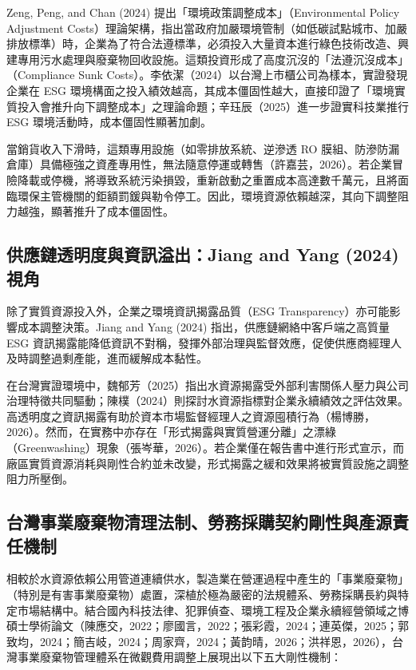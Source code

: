 \documentclass[12pt,a4paper]{article}
\begin{document}
Zeng, Peng, and Chan (2024) 提出「環境政策調整成本」（Environmental Policy Adjustment Costs）理論架構，指出當政府加嚴環境管制（如低碳試點城市、加嚴排放標準）時，企業為了符合法遵標準，必須投入大量資本進行綠色技術改造、興建專用污水處理與廢棄物回收設施。這類投資形成了高度沉沒的「法遵沉沒成本」（Compliance Sunk Costs）。李依潔（2024）以台灣上市櫃公司為樣本，實證發現企業在 ESG 環境構面之投入績效越高，其成本僵固性越大，直接印證了「環境實質投入會推升向下調整成本」之理論命題；辛珏辰（2025）進一步證實科技業推行 ESG 環境活動時，成本僵固性顯著加劇。

當銷貨收入下滑時，這類專用設施（如零排放系統、逆滲透 RO 膜組、防滲防漏倉庫）具備極強之資產專用性，無法隨意停運或轉售（許嘉芸，2026）。若企業冒險降載或停機，將導致系統污染損毀，重新啟動之重置成本高達數千萬元，且將面臨環保主管機關的鉅額罰鍰與勒令停工。因此，環境資源依賴越深，其向下調整阻力越強，顯著推升了成本僵固性。

\subsection{供應鏈透明度與資訊溢出：Jiang and Yang (2024) 視角}

除了實質資源投入外，企業之環境資訊揭露品質（ESG Transparency）亦可能影響成本調整決策。Jiang and Yang (2024) 指出，供應鏈網絡中客戶端之高質量 ESG 資訊揭露能降低資訊不對稱，發揮外部治理與監督效應，促使供應商經理人及時調整過剩產能，進而緩解成本黏性。

在台灣實證環境中，魏郁芳（2025）指出水資源揭露受外部利害關係人壓力與公司治理特徵共同驅動；陳樸（2024）則探討水資源指標對企業永續績效之評估效果。高透明度之資訊揭露有助於資本市場監督經理人之資源囤積行為（楊博勝，2026）。然而，在實務中亦存在「形式揭露與實質營運分離」之漂綠（Greenwashing）現象（張岑華，2026）。若企業僅在報告書中進行形式宣示，而廠區實質資源消耗與剛性合約並未改變，形式揭露之緩和效果將被實質設施之調整阻力所壓倒。

\subsection{台灣事業廢棄物清理法制、勞務採購契約剛性與產源責任機制}

相較於水資源依賴公用管道連續供水，製造業在營運過程中產生的「事業廢棄物」（特別是有害事業廢棄物）處置，深植於極為嚴密的法規體系、勞務採購長約與特定市場結構中。結合國內科技法律、犯罪偵查、環境工程及企業永續經營領域之博碩士學術論文（陳應交，2022；廖國言，2022；張彩霞，2024；連英傑，2025；郭致均，2024；簡吉岐，2024；周家齊，2024；黃韵晴，2026；洪祥恩，2026），台灣事業廢棄物管理體系在微觀費用調整上展現出以下五大剛性機制：
\end{document}
